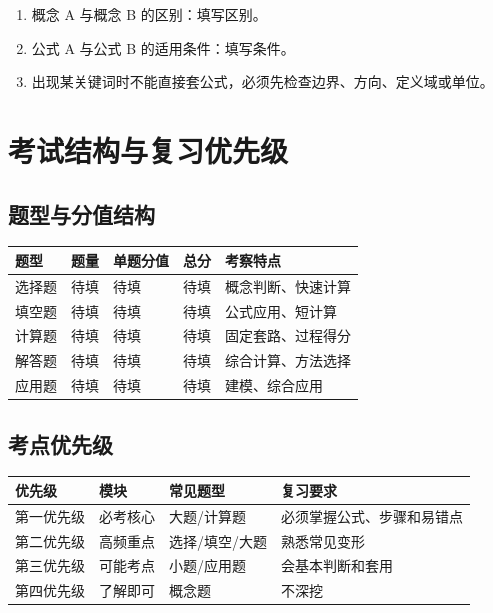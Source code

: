 \documentclass[UTF8,zihao=-4]{ctexart}
\begin{document}
\begin{warnbox}[最容易混淆的概念]
\begin{enumerate}
  \item 概念 A 与概念 B 的区别：填写区别。
  \item 公式 A 与公式 B 的适用条件：填写条件。
  \item 出现某关键词时不能直接套公式，必须先检查边界、方向、定义域或单位。
\end{enumerate}
\end{warnbox}

\section{考试结构与复习优先级}

\subsection{题型与分值结构}

\begin{longtable}{p{}p{}p{}p{}p{}}
\toprule
\textbf{题型} & \textbf{题量} & \textbf{单题分值} & \textbf{总分} & \textbf{考察特点} \\
\midrule
选择题 & 待填 & 待填 & 待填 & 概念判断、快速计算 \\
填空题 & 待填 & 待填 & 待填 & 公式应用、短计算 \\
计算题 & 待填 & 待填 & 待填 & 固定套路、过程得分 \\
解答题 & 待填 & 待填 & 待填 & 综合计算、方法选择 \\
应用题 & 待填 & 待填 & 待填 & 建模、综合应用 \\
\bottomrule
\end{longtable}

\subsection{考点优先级}

\begin{longtable}{p{}p{}p{}p{}}
\toprule
\textbf{优先级} & \textbf{模块} & \textbf{常见题型} & \textbf{复习要求} \\
\midrule
第一优先级 & 必考核心 & 大题/计算题 & 必须掌握公式、步骤和易错点 \\
第二优先级 & 高频重点 & 选择/填空/大题 & 熟悉常见变形 \\
第三优先级 & 可能考点 & 小题/应用题 & 会基本判断和套用 \\
第四优先级 & 了解即可 & 概念题 & 不深挖 \\
\bottomrule
\end{longtable}
\end{document}
